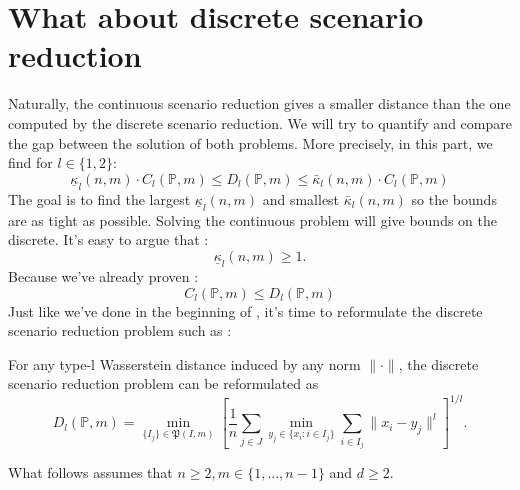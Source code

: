 \documentclass{amsart}
\begin{document}
\section{What about discrete scenario reduction}
Naturally, the continuous scenario reduction gives a smaller distance than the one computed by the discrete scenario reduction. We will try to quantify and compare the gap between the solution of both problems. More precisely, in this part, we find for $l\in\{1,2\}$: 
$$\underline{\kappa}_l\left(n,m\right)\cdot C_l\left( \mathbb{P},m\right)\leq D_l\left(\mathbb{P},m\right)\leq \bar{\kappa}_l\left(n,m\right)\cdot C_l\left(\mathbb{P},m\right)$$
The goal is to find the largest $\underline{\kappa}_l\left(n,m\right)$ and smallest $\bar{\kappa}_l\left(n,m\right)$ so the bounds are as tight as possible. Solving the continuous problem will give bounds on the discrete. It's easy to argue that : 
$$
\underline\kappa_l\left(n,m\right)\geq1.
$$
Because we've already proven : 
$$
C_l\left( \mathbb{P},m\right)\leq D_l\left( \mathbb{P},m\right)
$$
Just like we've done in the beginning of , it's time to reformulate the discrete scenario reduction problem such as :
\begin{theorem}\label{reformulation 2}
    For any type-l Wasserstein distance induced by any norm $\lVert\cdot\rVert$, the discrete scenario reduction problem can be reformulated as 
    $$
    D_l\left(\mathbb{P},m\right)=\min_{\{I_j\}\in\mathfrak{P}\left(I,m\right)}\left[ \frac{1}{n}\sum_{j\in J}\min_{y_j\in\{x_i : i\in I_j\}}\sum_{i\in I_j}\lVert x_i-y_j\rVert^l\right]^{1/l}.
    $$
\end{theorem}
What follows assumes that $n\geq2, m\in\{1,...,n-1\}$ and $d\geq2.$
\end{document}
